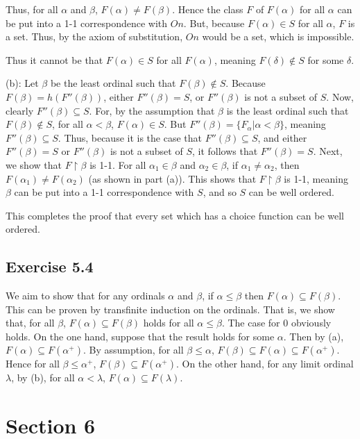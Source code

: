 \documentclass{article}
\theoremstyle{definition}
\begin{document}
Thus, for all $\alpha$ and $\beta$, $F(\alpha)\ne F(\beta)$. Hence the class $F$ of $F(\alpha)$ for all $\alpha$ can be put into a 1-1 
correspondence with $On$. But, because $F(\alpha)\in S$ for all $\alpha$, $F$ is a set. Thus, by the axiom of substitution, $On$ would be 
a set, which is impossible.

Thus it cannot be that $F(\alpha)\in S$ for all $F(\alpha)$, meaning $F(\delta)\notin S$ for some $\delta$.

(b): Let $\beta$ be the least ordinal such that $F(\beta)\notin S$. Because $F(\beta)=h(F''(\beta))$, either $F''(\beta)=S$, or $F''(\beta)$ is not a subset of $S$. 
Now, clearly $F''(\beta)\subseteq S$. For, by the assumption that $\beta$ is the least ordinal such that $F(\beta)\notin S$, for all $\alpha<\beta$, 
$F(\alpha)\in S$. But $F''(\beta)=\{F_\alpha|\alpha<\beta\}$, meaning $F''(\beta)\subseteq S$. Thus, because it is the case that $F''(\beta)\subseteq S$, and either 
$F''(\beta)=S$ or $F''(\beta)$ is not a subset of $S$, it follows that $F''(\beta)=S$. Next, we show that $F\restriction\beta$ is 1-1. For all $\alpha_1\in\beta$ and 
$\alpha_2\in\beta$, if $\alpha_1\ne\alpha_2$, then $F(\alpha_1)\ne F(\alpha_2)$ (as shown in part (a)). This shows that $F\restriction\beta$ is 1-1, meaning 
$\beta$ can be put into a 1-1 correspondence with $S$, and so $S$ can be well ordered.

This completes the proof that every set which has a choice function can be well ordered. 

\subsection*{Exercise 5.4}
We aim to show that for any ordinals $\alpha$ and $\beta$, if $\alpha\le\beta$ then $F(\alpha)\subseteq F(\beta)$. This can be proven by transfinite induction on the ordinals. 
That is, we show that, for all $\beta$, $F(\alpha)\subseteq F(\beta)$ holds for all $\alpha\le\beta$. The case for $0$ obviously holds. 
On the one hand, suppose that the result holds for some $\alpha$. Then by (a), $F(\alpha)\subseteq F(\alpha^+)$. By assumption, for all 
$\beta\le\alpha$, $F(\beta)\subseteq F(\alpha)\subseteq F(\alpha^+)$. Hence for all $\beta\le\alpha^+$, $F(\beta)\subseteq F(\alpha^+)$. On the other hand, 
for any limit ordinal $\lambda$, by (b), for all $\alpha<\lambda$, $F(\alpha)\subseteq F(\lambda)$.

\section*{Section 6}
\end{document}
